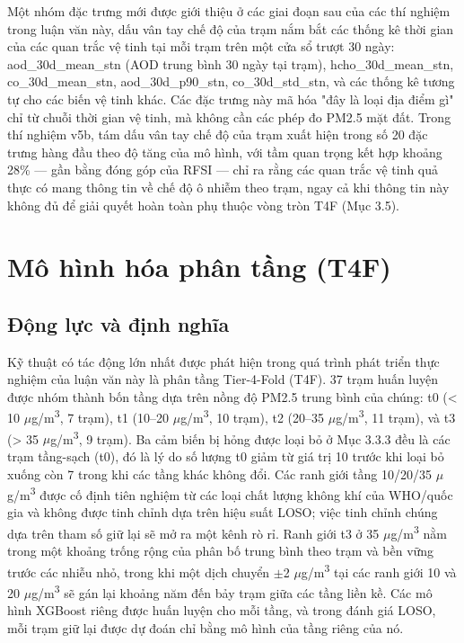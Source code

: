 Một nhóm đặc trưng mới được giới thiệu ở các giai đoạn sau của các thí nghiệm trong luận văn này, dấu vân tay chế độ của trạm nắm bắt các thống kê thời gian của các quan trắc vệ tinh tại mỗi trạm trên một cửa sổ trượt 30 ngày: aod\_30d\_mean\_stn (AOD trung bình 30 ngày tại trạm), hcho\_30d\_mean\_stn, co\_30d\_mean\_stn, aod\_30d\_p90\_stn, co\_30d\_std\_stn, và các thống kê tương tự cho các biến vệ tinh khác. Các đặc trưng này mã hóa "đây là loại địa điểm gì" chỉ từ chuỗi thời gian vệ tinh, mà không cần các phép đo PM2.5 mặt đất. Trong thí nghiệm v5b, tám dấu vân tay chế độ của trạm xuất hiện trong số 20 đặc trưng hàng đầu theo độ tăng của mô hình, với tầm quan trọng kết hợp khoảng 28\% --- gần bằng đóng góp của RFSI --- chỉ ra rằng các quan trắc vệ tinh quả thực có mang thông tin về chế độ ô nhiễm theo trạm, ngay cả khi thông tin này không đủ để giải quyết hoàn toàn phụ thuộc vòng tròn T4F (Mục 3.5).


\section{Mô hình hóa phân tầng (T4F)}

\subsection{Động lực và định nghĩa}

Kỹ thuật có tác động lớn nhất được phát hiện trong quá trình phát triển thực nghiệm của luận văn này là phân tầng Tier-4-Fold (T4F). 37 trạm huấn luyện được nhóm thành bốn tầng dựa trên nồng độ PM2.5 trung bình của chúng: t0 (< 10 $\mu$g/m\textsuperscript{3}, 7 trạm), t1 (10--20 $\mu$g/m\textsuperscript{3}, 10 trạm), t2 (20--35 $\mu$g/m\textsuperscript{3}, 11 trạm), và t3 (> 35 $\mu$g/m\textsuperscript{3}, 9 trạm). Ba cảm biến bị hỏng được loại bỏ ở Mục 3.3.3 đều là các trạm tầng-sạch (t0), đó là lý do số lượng t0 giảm từ giá trị 10 trước khi loại bỏ xuống còn 7 trong khi các tầng khác không đổi. Các ranh giới tầng 10/20/35 $\mu$g/m\textsuperscript{3} được cố định tiên nghiệm từ các loại chất lượng không khí của WHO/quốc gia và không được tinh chỉnh dựa trên hiệu suất LOSO; việc tinh chỉnh chúng dựa trên tham số giữ lại sẽ mở ra một kênh rò rỉ. Ranh giới t3 ở 35 $\mu$g/m\textsuperscript{3} nằm trong một khoảng trống rộng của phân bố trung bình theo trạm và bền vững trước các nhiễu nhỏ, trong khi một dịch chuyển $\pm$2 $\mu$g/m\textsuperscript{3} tại các ranh giới 10 và 20 $\mu$g/m\textsuperscript{3} sẽ gán lại khoảng năm đến bảy trạm giữa các tầng liền kề. Các mô hình XGBoost riêng được huấn luyện cho mỗi tầng, và trong đánh giá LOSO, mỗi trạm giữ lại được dự đoán chỉ bằng mô hình của tầng riêng của nó.

